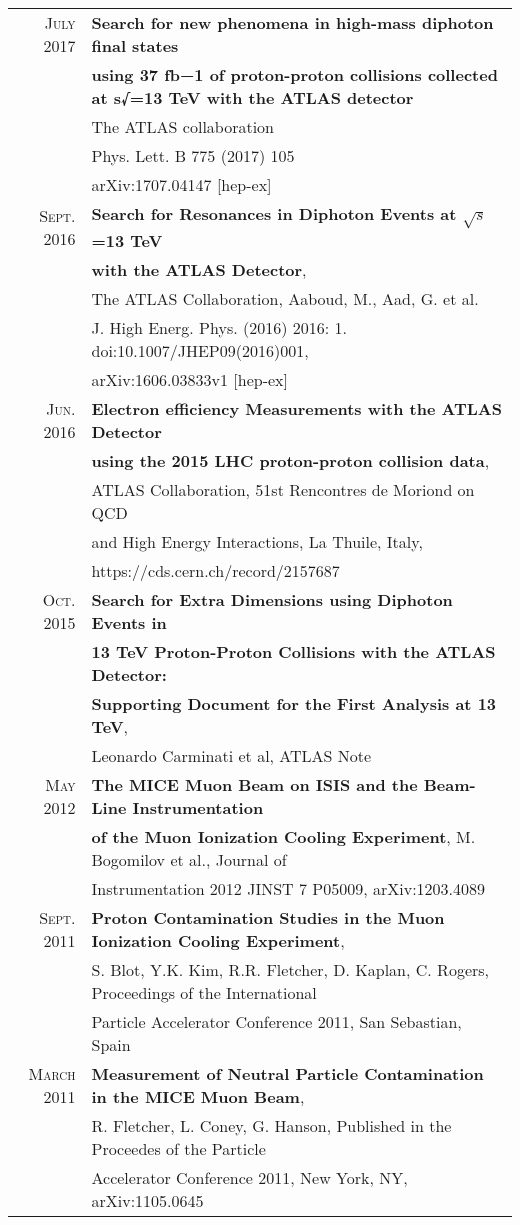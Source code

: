 \documentclass[a4paper,10pt]{article} %
\begin{document}
\begin{tabular}{rl}
\textsc{July} 2017 & \textbf{Search for new phenomena in high-mass diphoton final states}\\
									 & \textbf{using 37 fb−1 of proton-proton collisions collected at s√=13 TeV with the ATLAS detector}\\
									 & The ATLAS collaboration  \\
									 & Phys. Lett. B 775 (2017) 105 \\
									 & arXiv:1707.04147 [hep-ex]  \\
\textsc{Sept.} 2016 & \textbf{Search for Resonances in Diphoton Events at $\sqrt{s}$=13 TeV} \\
									& \textbf{with the ATLAS Detector}, \\
									& The ATLAS Collaboration, Aaboud, M., Aad, G. et al.  \\
									& J. High Energ. Phys. (2016) 2016: 1. doi:10.1007/JHEP09(2016)001, \\
									& arXiv:1606.03833v1 [hep-ex] \\
\textsc{Jun.} 2016 & \textbf{Electron efficiency Measurements with the ATLAS Detector} \\
									& \textbf{using the 2015 LHC proton-proton collision data}, \\
									& ATLAS Collaboration, 51st Rencontres de Moriond on QCD \\
									& and High Energy Interactions, La Thuile, Italy, \\
									& https://cds.cern.ch/record/2157687 \\
\textsc{Oct.} 2015 & \textbf{Search for Extra Dimensions using Diphoton Events in} \\
									 & \textbf{13 TeV Proton-Proton Collisions with the ATLAS Detector:} \\
									 & \textbf{Supporting Document for the First Analysis at 13 TeV}, \\
									 & Leonardo Carminati et al, ATLAS Note \\
\textsc{May} 2012  & \textbf{The MICE Muon Beam on ISIS and the Beam-Line Instrumentation} \\
                   & \textbf{of the Muon Ionization Cooling Experiment}, M. Bogomilov et al., Journal of \\
				   & Instrumentation 2012 JINST 7 P05009, arXiv:1203.4089 \\
\textsc{Sept.} 2011 & \textbf{Proton Contamination Studies in the Muon Ionization Cooling Experiment}, \\
					& S. Blot, Y.K. Kim, R.R. Fletcher, D. Kaplan, C. Rogers, Proceedings of the International \\
					& Particle Accelerator Conference 2011, San Sebastian, Spain \\
\textsc{March} 2011 & \textbf{Measurement of Neutral Particle Contamination in the MICE Muon Beam},\\
					& R. Fletcher, L. Coney, G. Hanson, Published in the Proceedes of the Particle \\
                    & Accelerator Conference 2011, New York, NY, arXiv:1105.0645\\

\end{tabular}
\end{document}
